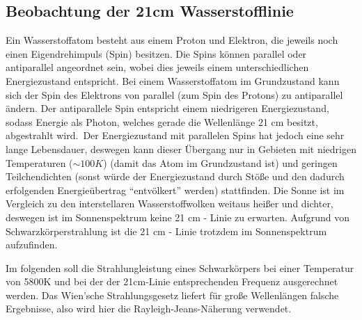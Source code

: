 
\subsection{Beobachtung der 21cm Wasserstofflinie}
Ein Wasserstoffatom besteht aus einem Proton und Elektron, die jeweils noch einen Eigendrehimpuls (Spin) besitzen. Die Spins können parallel oder antiparallel angeordnet sein, wobei dies jeweils einem unterschiedlichen Energiezustand entspricht. Bei einem Wasserstoffatom im Grundzustand kann sich der Spin des Elektrons von parallel (zum Spin des Protons) zu antiparallel ändern. Der antiparallele Spin entspricht einem niedrigeren Energiezustand, sodass Energie als Photon, welches gerade die Wellenlänge 21 cm besitzt, abgestrahlt wird.\
Der Energiezustand mit parallelen Spins hat jedoch eine sehr lange Lebensdauer, deswegen kann dieser Übergang nur in Gebieten mit niedrigen Temperaturen ($\sim 100K$) (damit das Atom im Grundzustand ist) und geringen Teilchendichten (sonst würde der Energiezustand durch Stöße und den dadurch erfolgenden Energieübertrag \enquote{entvölkert} werden) stattfinden. Die Sonne ist im Vergleich zu den interstellaren Wasserstoffwolken weitaus heißer und dichter, deswegen ist im Sonnenspektrum keine 21 cm - Linie zu erwarten. Aufgrund von Schwarzkörperstrahlung ist die 21 cm - Linie trotzdem im Sonnenspektrum aufzufinden.

Im folgenden soll die Strahlungleistung eines Schwarkörpers bei einer Temperatur von 5800K und bei der der 21cm-Linie entsprechenden Frequenz ausgerechnet werden. Das Wien'sche Strahlungsgesetz liefert für große Wellenlängen falsche Ergebnisse, also wird hier die Rayleigh-Jeans-Näherung verwendet.

